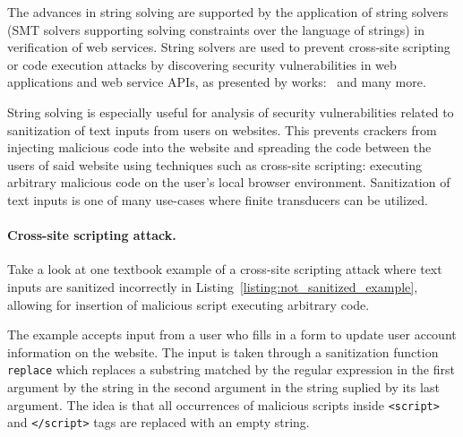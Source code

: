 The advances in string solving are supported by the application of string solvers (SMT solvers supporting solving constraints over the language of strings) in verification of web services.
String solvers are used to prevent cross-site scripting or code execution attacks by discovering security vulnerabilities in web applications and web service APIs, as presented by works:~\cite{String_constraints_with_concatenation_and_transducers_solved_efficiently, Composing_Static_and_Dynamic_Analysis_to_Validate_Sanitization_in_Web_Applications, Satisfiability_Modulo_Theories_Introduction_and_Applications, Simple_linear_string_constraints,Z3-str_a_z3-based_string_solver_for_web_application_analysis,S3_A_Symbolic_String_Solver_for_Vulnerability_Detection_in_Web_Applications} and many more.

String solving is especially useful for analysis of security vulnerabilities related to sanitization of text inputs from users on websites.
This prevents crackers from injecting malicious code into the website and spreading the code between the users of said website using techniques such as cross-site scripting: executing arbitrary malicious code on the user's local browser environment.
Sanitization of text inputs is one of many use-cases where finite transducers can be utilized.

\paragraph{Cross-site scripting attack.}
Take a look at one textbook example of a cross-site scripting attack where text inputs are sanitized incorrectly in Listing~\ref{listing:not_sanitized_example}, allowing for insertion of malicious script executing arbitrary code.

The example accepts input from a user who fills in a form to update user account information on the website.
The input is taken through a sanitization function \texttt{replace} which replaces a substring matched by the regular expression in the first argument by the string in the second argument in the string suplied by its last argument.
The idea is that all occurrences of malicious scripts inside \texttt{<script>} and \texttt{</script>} tags are replaced with an empty string.

